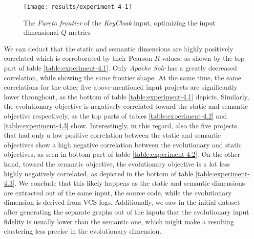 \documentclass[12pt,a4paper]{report}
\begin{document}
\begin{figure}[htbp]
\centering
\texttt{[image: results/experiment\_4-1]}
\caption{The \textit{Pareto frontier} of the \textit{KeyCloak} input, optimizing the input dimensional $Q$ metrics}
\label{fig:experiment-4.1}
\end{figure}

We can deduct that the static and semantic dimensions are highly positively
correlated which is corroborated by their Pearson $R$ values, as shown by
the top part of table \ref{table:experiment-4.1}.
Only \textit{Apache Solr} has a greatly decreased correlation, while showing
the same frontier shape.
At the same time, the same correlations for the other five above\hyp mentioned
input projects are significantly lower throughout, as the bottom of table
\ref{table:experiment-4.1} depicts.
Similarly, the evolutionary objective is negatively correlated toward the static
and semantic objective respectively, as the top parts of tables
\ref{table:experiment-4.2} and \ref{table:experiment-4.3} show.
Interestingly, in this regard, also the five projects that had only a low
positive correlation between the static and semantic objectives show a high
negative correlation between the evolutionary and static objectives,
as seen in bottom part of table \ref{table:experiment-4.2}.
On the other hand, toward the semantic objective, the evolutionary objective
is a lot less highly negatively correlated, as depicted in the bottom of table
\ref{table:experiment-4.3}.
We conclude that this likely happens as the static and semantic dimensions are
extracted out of the same input, the source code, while the evolutionary
dimension is derived from VCS logs. Additionally, we saw in the initial dataset
after generating the separate graphs out of the inputs that the evolutionary
input fidelity is usually lower than the semantic one, which might make a
resulting clustering less precise in the evolutionary dimension.
\end{document}
